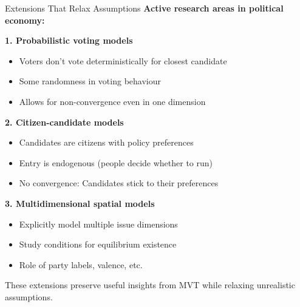 \documentclass[10pt]{beamer}
\begin{document}
\begin{frame}[allowframebreaks]{Extensions That Relax Assumptions}
\textbf{Active research areas in political economy:}



\textbf{1. Probabilistic voting models}
\begin{itemize}
\item Voters don't vote deterministically for closest candidate
\item Some randomness in voting behaviour
\item Allows for non-convergence even in one dimension
\end{itemize}



\textbf{2. Citizen-candidate models}
\begin{itemize}
\item Candidates are citizens with policy preferences
\item Entry is endogenous (people decide whether to run)
\item No convergence: Candidates stick to their preferences
\end{itemize}


 \framebreak   
\textbf{3. Multidimensional spatial models}
\begin{itemize}
\item Explicitly model multiple issue dimensions
\item Study conditions for equilibrium existence
\item Role of party labels, valence, etc.
\end{itemize}



\alert{These extensions preserve useful insights from MVT while relaxing unrealistic assumptions.}
\end{frame}
\end{document}
